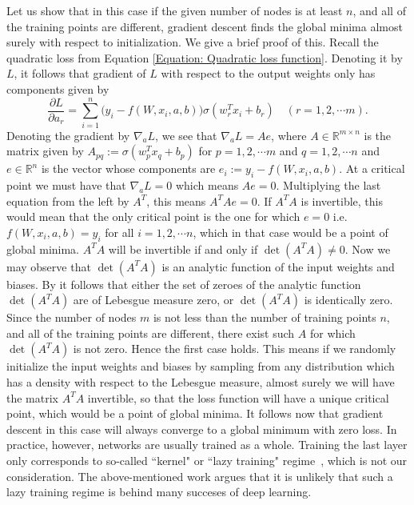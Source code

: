 \documentclass[a4paper,11pt]{amsart}
\theoremstyle{definition}
\theoremstyle{plain}
\theoremstyle{remark}
\newcommand{\IR}{\mathbb{R}}
\begin{document}
Let us show that in this case if the given number of nodes is at least $n$, and all of the training points are different, gradient descent finds the global minima almost surely with respect to initialization.
We give a brief proof of this. 
Recall the quadratic loss from Equation \eqref{Equation: Quadratic loss function}. 
Denoting it by $L$, it follows that gradient of $L$ with respect to the output weights only has components given by 
\[
\frac{\partial L}{\partial a_r}=\sum_{i=1}^n\Big(y_i-f(W,x_i,a,b)\Big)\sigma(w_r^Tx_i+b_r)\quad(r=1,2,\cdots m).
\]
Denoting the gradient by $\nabla_aL$, we see that $\nabla_aL=Ae$, where $A\in\IR^{m\times n}$ is the matrix given by $A_{pq}:=\sigma(w_p^Tx_q+b_p)$ for $p=1,2,\cdots m$ and $q=1,2,\cdots n$ and $e\in \IR^n$ is the vector whose components are $e_i:=y_i-f(W,x_i,a,b)$. 
At a critical point we must have that $\nabla_aL=0$ which means $Ae=0$. Multiplying the last equation from the left by $A^T$, this means $A^TAe=0$. 
If $A^TA$ is invertible, this would mean that the only critical point is the one for which $e=0$ i.e. $f(W,x_i,a,b)=y_i$ for all $i=1,2,\cdots n$, which in that case would be a point of global minima. 
$A^TA$ will be invertible if and only if $\det (A^TA)\neq 0$. Now we may observe that $\det (A^TA)$ is an analytic function of the input weights and biases. 
By \cite[Lemma 1.2]{NguyenComplexPowers} it follows that either the set of zeroes of the analytic function $\det (A^TA)$ are of Lebesgue measure zero, or $\det (A^T A)$ is identically zero.
Since the number of nodes $m$ is not less than the number of training points $n$, and all of the training points are different, there exist such $A$ for which $\det (A^T A)$ is not zero.
Hence the first case holds.
This means if we randomly initialize the input weights and biases by sampling from any distribution which has a density with respect to the Lebesgue measure, almost surely we will have the matrix $A^TA$ invertible, so that the loss function will have a unique critical point, which would be a point of global minima. 
It follows now that gradient descent in this case will always converge to a global minimum with zero loss.
In practice, however, networks are usually trained as a whole.
Training the last layer only corresponds to so-called ``kernel" or ``lazy training" regime~\cite{lazy_training}, which is not our consideration.
The above-mentioned work argues that it is unlikely that such a lazy training regime is behind many succeses of deep learning.

\subsection*{}
\end{document}
